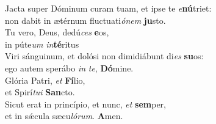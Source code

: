 \oddverse Jacta super Dóminum curam tuam, et ipse te \textit{e}\textbf{nú}triet:~\*\\
\oddverse non dabit in ætérnum fluctuati\textit{ó}\textit{nem} \textbf{ju}sto.\\
\evenverse Tu vero, Deus, dedú\textit{ces} \textbf{e}os,~\*\\
\evenverse in púte\textit{um} \textit{in}\textbf{té}ritus\\
\oddverse Viri sánguinum, et dolósi non dimidiábunt di\textit{es} \textbf{su}os:~\*\\
\oddverse ego autem sperábo \textit{in} \textit{te}, \textbf{Dó}mine.\\
\evenverse Glória Patri, \textit{et} \textbf{Fí}lio,~\*\\
\evenverse et Spirí\textit{tu}\textit{i} \textbf{San}cto.\\
\oddverse Sicut erat in princípio, et nunc, \textit{et} \textbf{sem}per,~\*\\
\oddverse et in sǽcula sæcu\textit{ló}\textit{rum}. \textbf{A}men.\\
